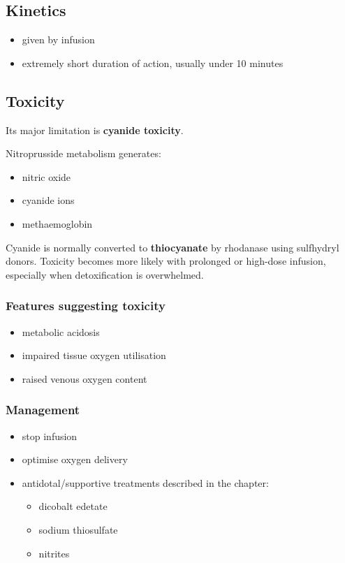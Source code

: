 \documentclass[11pt,a4paper]{article}
\begin{document}
\subsection{Kinetics}
\begin{itemize}
    \item given by infusion
    \item extremely short duration of action, usually under 10 minutes
\end{itemize}

\subsection{Toxicity}

Its major limitation is \textbf{cyanide toxicity}.

Nitroprusside metabolism generates:
\begin{itemize}
    \item nitric oxide
    \item cyanide ions
    \item methaemoglobin
\end{itemize}

Cyanide is normally converted to \textbf{thiocyanate} by rhodanase using sulfhydryl donors. Toxicity becomes more likely with prolonged or high-dose infusion, especially when detoxification is overwhelmed.

\subsubsection*{Features suggesting toxicity}
\begin{itemize}
    \item metabolic acidosis
    \item impaired tissue oxygen utilisation
    \item raised venous oxygen content
\end{itemize}

\subsubsection*{Management}
\begin{itemize}
    \item stop infusion
    \item optimise oxygen delivery
    \item antidotal/supportive treatments described in the chapter:
    \begin{itemize}
        \item dicobalt edetate
        \item sodium thiosulfate
        \item nitrites
    \end{itemize}
\end{itemize}
\end{document}
